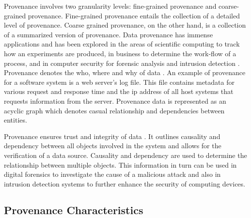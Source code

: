 Provenance involves two granularity levels: fine-grained provenance and coarse-grained provenance. Fine-grained provenance \cite{glavic_case_2011} entails the collection of a detailed level of provenance. Coarse grained provenance, on the other hand, is a collection of a summarized version of provenance. Data provenance has immense applications and has been explored in the areas of scientific computing \cite{groth, altintas} to track how an experiments are produced, in business to determine the work-flow of  a process, and in computer security for forensic analysis and intrusion detection \cite{bates_towards_2013, muniswamy_reddy_provenance_2010, muniswamy_reddy} . Provenance denotes the who, where and why of data \cite{cheney_provenance_2009}. An example of provenance for a software system is a web server's log file. This file contains metadata for various request and response time and the ip address of all host systems that requests information from the server. Provenance data is represented as an acyclic graph which denotes casual relationship and dependencies between entities.
\par Provenance ensures trust and integrity of data \cite{Bertino2015}. It outlines causality and dependency between all objects involved in the system and allows for the verification of a data source. Causality and dependency are used to determine the relationship between multiple objects. This information in turn can be used in digital forensics \cite{zawoadfecloud} to investigate the cause of a malicious attack and also in intrusion detection systems to further enhance the security of computing devices. 
 



%
%



\subsection{Provenance Characteristics}

